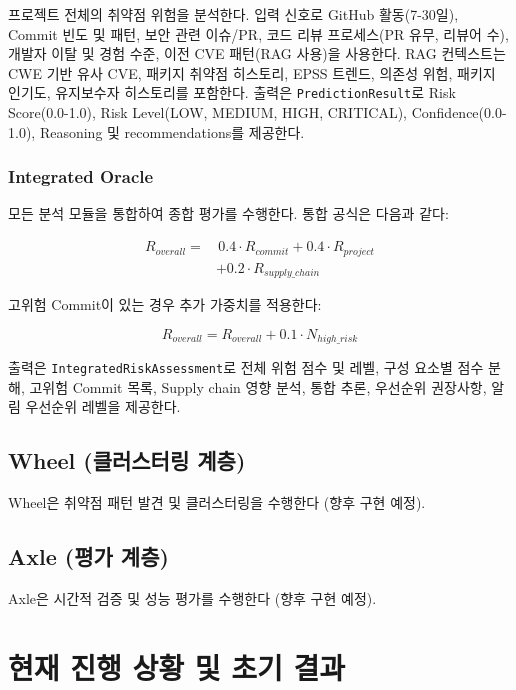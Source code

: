 ﻿\documentclass[conference]{IEEEtran}
\begin{document}
프로젝트 전체의 취약점 위험을 분석한다. 입력 신호로 GitHub 활동(7-30일), Commit 빈도 및 패턴, 보안 관련 이슈/PR, 코드 리뷰 프로세스(PR 유무, 리뷰어 수), 개발자 이탈 및 경험 수준, 이전 CVE 패턴(RAG 사용)을 사용한다. RAG 컨텍스트는 CWE 기반 유사 CVE, 패키지 취약점 히스토리, EPSS 트렌드, 의존성 위험, 패키지 인기도, 유지보수자 히스토리를 포함한다. 출력은 \texttt{PredictionResult}로 Risk Score(0.0-1.0), Risk Level(LOW, MEDIUM, HIGH, CRITICAL), Confidence(0.0-1.0), Reasoning 및 recommendations를 제공한다.

\subsubsection{Integrated Oracle}

모든 분석 모듈을 통합하여 종합 평가를 수행한다. 통합 공식은 다음과 같다:

\begin{equation}
\begin{split}
R_{overall} = & \, 0.4 \cdot R_{commit} + 0.4 \cdot R_{project} \\
              & + 0.2 \cdot R_{supply\_chain}
\end{split}
\end{equation}

고위험 Commit이 있는 경우 추가 가중치를 적용한다:

\begin{equation}
R_{overall} = R_{overall} + 0.1 \cdot N_{high\_risk}
\end{equation}

출력은 \texttt{IntegratedRiskAssessment}로 전체 위험 점수 및 레벨, 구성 요소별 점수 분해, 고위험 Commit 목록, Supply chain 영향 분석, 통합 추론, 우선순위 권장사항, 알림 우선순위 레벨을 제공한다.

\subsection{Wheel (클러스터링 계층)}

Wheel은 취약점 패턴 발견 및 클러스터링을 수행한다 (향후 구현 예정).

\subsection{Axle (평가 계층)}

Axle은 시간적 검증 및 성능 평가를 수행한다 (향후 구현 예정).


\section{현재 진행 상황 및 초기 결과}
\end{document}

